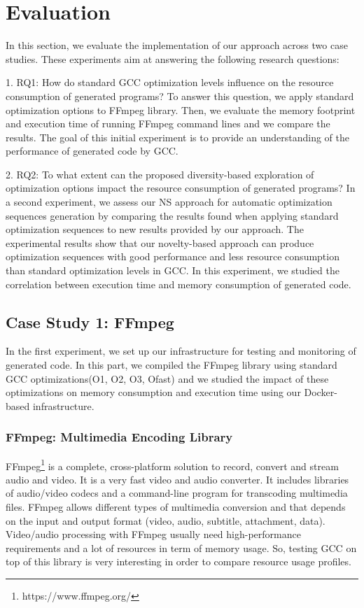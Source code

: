 \section{Evaluation}
In this section, we evaluate the implementation of our approach across two case studies. These experiments aim at answering the following research questions:

1. RQ1: How do standard GCC optimization levels influence on the resource consumption of generated programs?
To answer this question, we apply standard optimization options to FFmpeg library. Then, we evaluate the memory footprint and execution time of running FFmpeg command lines and we compare the results. The goal of this initial experiment is to
provide an understanding of the performance of generated code by GCC.

2. RQ2: To what extent can the proposed diversity-based exploration of optimization options impact the resource consumption of generated programs?
In a second experiment, we assess our NS approach for automatic optimization sequences generation by comparing the results found when applying standard optimization sequences to new results provided by our approach. The experimental results show that our novelty-based approach can produce optimization sequences with good performance and less resource consumption
than standard optimization levels in GCC. In this experiment, we studied the correlation between execution time and memory consumption of generated code.


\subsection{Case Study 1: FFmpeg}
In the first experiment, we set up our infrastructure for testing and monitoring of generated code. In this part, we compiled the FFmpeg library using standard GCC optimizations(O1, O2, O3, Ofast) and we studied the impact of these optimizations on memory consumption and execution time using our Docker-based infrastructure.

\subsubsection{FFmpeg: Multimedia Encoding Library}
FFmpeg\footnote{https://www.ffmpeg.org/} is a complete, cross-platform solution to record, convert and stream audio and video. It is a very fast video and audio converter. It includes libraries of audio/video codecs and a command-line program for transcoding multimedia files. FFmpeg allows different types of multimedia conversion and that depends on the input and output format (video, audio, subtitle, attachment, data). Video/audio processing with FFmpeg usually need high-performance requirements and a lot of resources in term of memory usage. So, testing GCC on top of this library is very interesting in order to compare resource usage profiles. 
